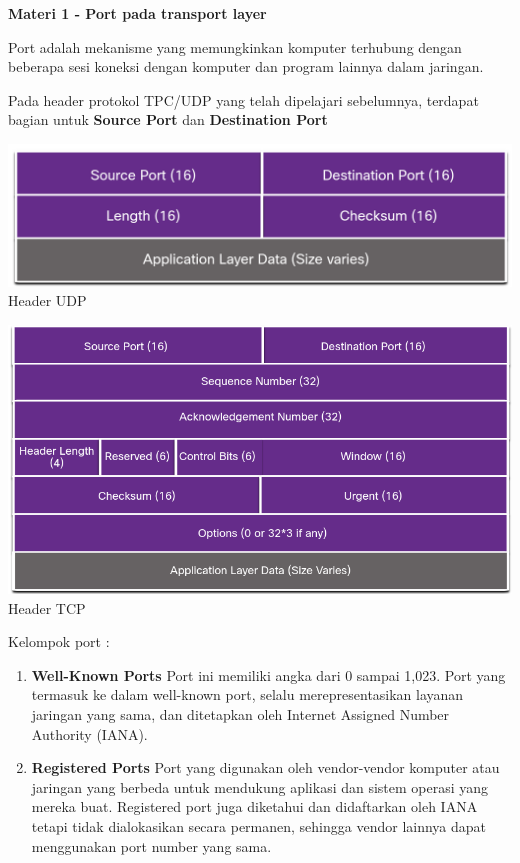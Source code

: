 \documentclass{article}
\begin{document}
    \begin{flushleft}
        \textbf{Materi 1 - Port pada transport layer}
        \newline

        Port adalah mekanisme yang memungkinkan komputer terhubung dengan beberapa sesi koneksi dengan komputer dan program lainnya dalam jaringan.
        \newline

        Pada header protokol TPC/UDP yang telah dipelajari sebelumnya, terdapat bagian untuk \textbf{Source Port} dan \textbf{Destination Port}

        \begin{center}
            \includegraphics[scale=0.4]{1-2.png}
            Header UDP
        
            \includegraphics[scale=0.5]{1-1.png}
            Header TCP
        \end{center}

        Kelompok port :
        \begin{enumerate}
            \item \textbf{Well-Known Ports}
            Port ini memiliki angka dari 0 sampai 1,023. Port yang termasuk ke dalam well-known port, selalu merepresentasikan layanan jaringan yang sama, dan ditetapkan oleh Internet Assigned Number Authority (IANA).

            \item \textbf{Registered Ports}
            Port yang digunakan oleh vendor-vendor komputer atau jaringan yang berbeda untuk mendukung aplikasi dan sistem operasi yang mereka buat. 
            Registered port juga diketahui dan didaftarkan oleh IANA tetapi tidak dialokasikan secara permanen, sehingga vendor lainnya dapat menggunakan port number yang sama.


\end{enumerate}
\end{flushleft}
\end{document}
